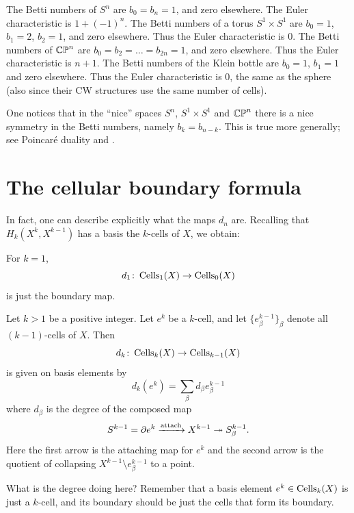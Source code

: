 \begin{example}
	\listhack
	\begin{enumerate}[(a)]
		\ii The Betti numbers of $S^n$ are $b_0 = b_n = 1$,
		and zero elsewhere. The Euler characteristic is $1 + (-1)^n$.
		\ii The Betti numbers of a torus $S^1 \times S^1$
		are $b_0 = 1$, $b_1 = 2$, $b_2 = 1$, and zero elsewhere.
		Thus the Euler characteristic is $0$.
		\ii The Betti numbers of $\mathbb{CP}^n$ are $b_0 = b_2 = \dots = b_{2n} = 1$,
		and zero elsewhere. Thus the Euler characteristic is $n+1$.
		\ii The Betti numbers of the Klein bottle
		are $b_0 = 1$, $b_1 = 1$ and zero elsewhere.
		Thus the Euler characteristic is $0$, the same as the sphere
		(also since their CW structures use the same number of cells).
	\end{enumerate}
	One notices that in the ``nice'' spaces $S^n$, $S^1 \times S^1$ and $\mathbb{CP}^n$
	there is a nice symmetry in the Betti numbers, namely $b_k = b_{n-k}$.
	This is true more generally; see Poincar\'e duality and .
\end{example}

\section{The cellular boundary formula}
In fact, one can describe explicitly what the maps $d_n$ are.
Recalling that $H_k(X^k, X^{k-1})$ has a basis the $k$-cells of $X$, we obtain:
\begin{theorem}
	[Cellular boundary formula for $k=1$]
	For $k=1$, \[ d_1 \colon \operatorname{Cells}_1(X) \to \operatorname{Cells}_0(X) \] is just the boundary map.
\end{theorem}
\begin{theorem}
	Let $k > 1$ be a positive integer.
	Let $e^k$ be a $k$-cell, and let $\{e_\beta^{k-1}\}_\beta$
	denote all $(k-1)$-cells of $X$.
	Then \[ d_k \colon \operatorname{Cells}_k(X) \to \operatorname{Cells}_{k-1}(X) \]
	is given on basis elements by
	\[ d_k(e^k) = \sum_\beta d_\beta e_\beta^{k-1} \]
	where $d_\beta$ is the degree of the composed map
	\[ S^{k-1} = \partial e^k \xrightarrow{\text{attach}}
		X^{k-1} \twoheadrightarrow S_\beta^{k-1}. \]
	Here the first arrow is the attaching map for $e^k$
	and the second arrow is the quotient of collapsing
	$X^{k-1} \setminus e^{k-1}_\beta$ to a point.
\end{theorem}

What is the degree doing here? Remember that a basis element $e^k \in \operatorname{Cells}_k(X)$ is just a
$k$-cell, and its boundary should be just the cells that form its boundary.

